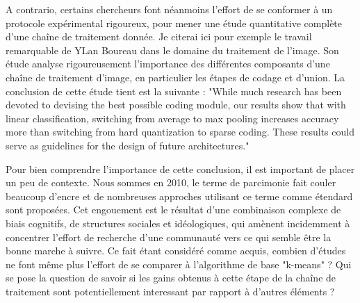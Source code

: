 
A contrario, certains chercheurs font néanmoins l'effort de se conformer à un protocole expérimental rigoureux, pour mener une étude quantitative complète d'une chaîne de traitement donnée. Je citerai ici pour exemple le travail remarquable de YLan Boureau dans le domaine du traitement de l'image\cite{boureau2010learning}. Son étude analyse rigoureusement l'importance des différentes composants d'une chaîne de traitement d'image, en particulier les étapes de codage et d'union. La conclusion de cette étude tient est la suivante :  "While much research has been devoted to devising
the best possible coding module, our results show that with
linear classification, switching from average to max pooling
increases accuracy more than switching from hard quantization to sparse coding. These results could serve as guidelines for the design of future architectures."

Pour bien comprendre l'importance de cette conclusion, il est important de placer un peu de contexte. Nous sommes en 2010, le terme de parcimonie fait couler beaucoup d'encre et de nombreuses approches utilisant ce terme comme étendard sont proposées. Cet engouement est le résultat d'une combinaison complexe de biais cognitifs, de structures sociales et idéologiques, qui amènent incidemment à concentrer l'effort de recherche d'une communauté vers ce qui semble être la bonne marche à suivre. Ce fait étant considéré comme acquis, combien d'études ne font même plus l'effort de se comparer à l'algorithme de base "k-means" ? Qui se pose la question de savoir si les gains obtenus à cette étape de la chaîne de traitement sont potentiellement interessant par rapport à d'autres éléments ?

